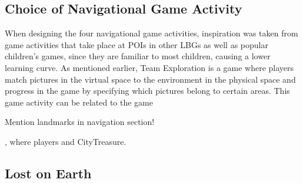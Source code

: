 \subsection{Choice of Navigational Game Activity}
When designing the four navigational game activities, inspiration was taken from game activities that take place at POIs in other LBGs as well as popular children's games, since they are familiar to most children, causing a lower learning curve. As mentioned earlier, Team Exploration\cite{GamingOnTheMove} is a game where players match pictures in the virtual space to the environment in the physical space and progress in the game by specifying which pictures belong to certain areas. This game activity can be related to the game 

Mention landmarks in navigation section!

 , where players  and CityTreasure\cite{botturi2009city}. 

\subsection{Lost on Earth}
